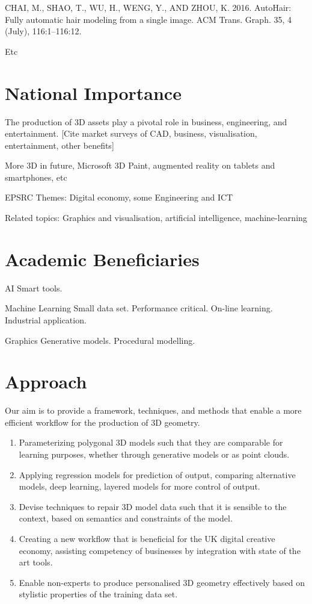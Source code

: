\documentclass[a4paper, fontsize=15pt, onecolumn]{article} %
\numberwithin{equation}{section} %
\numberwithin{figure}{section} %
\numberwithin{table}{section} %
\begin{document}
CHAI, M., SHAO, T., WU, H., WENG, Y., AND ZHOU, K. 2016. AutoHair: Fully automatic hair modeling from a single image. ACM Trans. Graph. 35, 4 (July), 116:1–116:12.

Etc

\section{National Importance}
The production of 3D assets play a pivotal role in business, engineering, and entertainment.
[Cite market surveys of CAD, business, visualisation, entertainment, other benefits]

More 3D in future, Microsoft 3D Paint, augmented reality on tablets and smartphones, etc

EPSRC Themes: Digital economy, some Engineering and ICT

Related topics: Graphics and visualisation, artificial intelligence, machine-learning



\section{Academic Beneficiaries}
AI
Smart tools.

Machine Learning
Small data set.
Performance critical.
On-line learning.
Industrial application.

Graphics
Generative models.
Procedural modelling.

\section{Approach}
Our aim is to provide a framework, techniques, and methods that enable a more efficient workflow for the production of 3D geometry.
\begin{enumerate}
	\item Parameterizing polygonal 3D models such that they are comparable for learning purposes, whether through generative models or as point clouds.
	\item Applying regression models for prediction of output, comparing alternative models, deep learning, layered models for more control of output.
	\item Devise techniques to repair 3D model data such that it is sensible to the context, based on semantics and constraints of the model.
	\item Creating a new workflow that is beneficial for the UK digital creative economy, assisting competency of businesses by integration with state of the art tools.
	\item Enable non-experts to produce personalised 3D geometry effectively based on stylistic properties of the training data set.
\end{enumerate}
\end{document}
